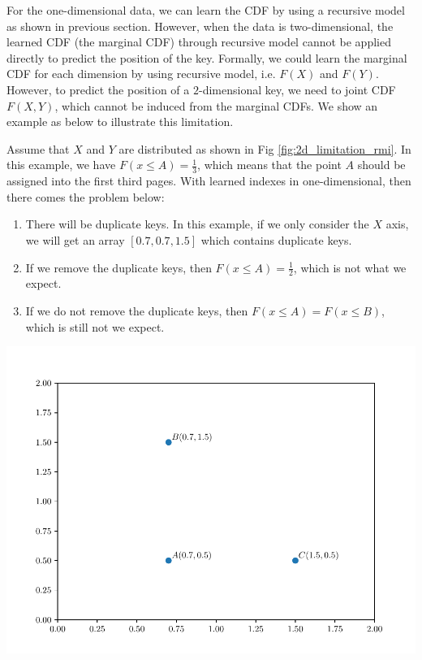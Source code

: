 For the one-dimensional data, we can learn the CDF by using a recursive model as shown in previous section. However, when the data is two-dimensional, the learned CDF (the marginal CDF) through recursive model cannot be applied directly to predict the position of the key. Formally, we could learn the marginal CDF for each dimension by using recursive model, i.e. $F(X)$ and $F(Y)$. However, to predict the position of a $2$-dimensional key, we need to joint CDF $F(X,Y)$, which cannot be induced from the marginal CDFs. We show an example as below to illustrate this limitation.

\begin{mscexample}
	Assume that $X$ and $Y$ are distributed as shown in Fig \ref{fig:2d_limitation_rmi}. In this example, we have $F(x\leq A)=\frac{1}{3}$, which means that the point $A$ should be assigned into the first third pages. With learned indexes in one-dimensional, then there comes the problem below:
	
	\begin{enumerate}
		\item There will be duplicate keys. In this example, if we only consider the $X$ axis, we will get an array $[0.7, 0.7, 1.5]$ which contains duplicate keys. 
		\item If we remove the duplicate keys, then $F(x\leq A)=\frac{1}{2}$, which is not what we expect.
		\item If we do not remove the duplicate keys, then $F(x\leq A)=F(x\leq B)$, which is still not we expect.
	\end{enumerate}
	

		\centering
		\includegraphics[scale=0.5]{graphs/implementation/2d/2d_rmi_limitation}
		\label{fig:2d_limitation_rmi}

	
\end{mscexample}


